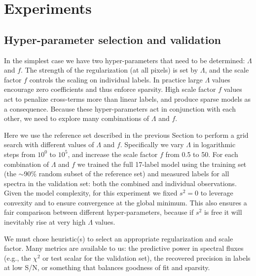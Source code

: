 \documentclass[12pt,preprint]{aastex}
\begin{document}
\section{Experiments}
\label{sec:experiments}


\subsection{Hyper-parameter selection and validation}
\label{sec:hyper-parameter-validation}


In the simplest case we have two hyper-parameters that need to be determined: 
$\Lambda$ and $f$.  The strength of the regularization (at all pixels) is set 
by $\Lambda$, and the scale factor $f$ controls the scaling on individual 
labels.  In practice large $\Lambda$ values encourage zero coefficients and thus enforce sparsity.  High scale factor $f$
values act to penalize cross-terms more than linear labels, and produce sparse
models as a consequence.  Because these hyper-parameters act in conjunction 
with each other, we need to explore many combinations of $\Lambda$ and $f$.


Here we use the reference set described in the previous Section to perform a
grid search with different values of $\Lambda$ and $f$.  Specifically we vary 
$\Lambda$ in logarithmic steps from $10^0$ to $10^5$, and increase the 
scale factor $f$ from 0.5 to 50.  For each combination of $\Lambda$ and $f$ we 
trained the full 17-label model using the training set (the $\sim$90\% random
subset of the reference set) and measured labels for all spectra in the
validation set: both the combined and individual observations.  Given the model
complexity, for this experiment we fixed $s^2 = 0$ to leverage convexity
and to ensure convergence at the global minimum.  This also ensures a fair
comparison between different hyper-parameters, because if $s^2$ is free it
will inevitably rise at very high $\Lambda$ values.  


We must chose heuristic(s) to select an appropriate regularization and scale
factor.  Many metrics are available to us: the predictive power in spectral
fluxes (e.g., the $\chi^2$ or test scalar for the validation set), the 
recovered precision in labels at low S/N, or something that balances goodness of fit and sparsity.
\end{document}
